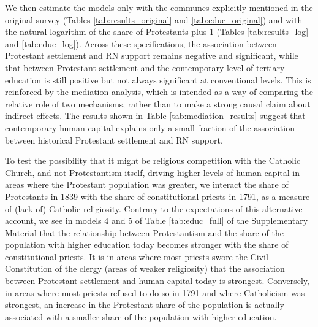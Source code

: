 \documentclass[12pt]{article}
\begin{document}
We then estimate the models only with the communes explicitly mentioned in the original survey (Tables \ref{tab:results_original} and \ref{tab:educ_original}) and with the natural logarithm of the share of Protestants plus 1 (Tables \ref{tab:results_log} and \ref{tab:educ_log}). Across these specifications, the association between Protestant settlement and RN support remains negative and significant, while that between Protestant settlement and the contemporary level of tertiary education is still positive but not always significant at conventional levels. This is reinforced by the mediation analysis, which is intended as a way of comparing the relative role of two mechanisms, rather than to make a strong causal claim about indirect effects. The results shown in Table \ref{tab:mediation_results} suggest that contemporary human capital explains only a small fraction of the association between historical Protestant settlement and RN support.

To test the possibility that it might be religious competition with the Catholic Church, and not Protestantism itself, driving higher levels of human capital in areas where the Protestant population was greater, we interact the share of Protestants in 1839 with the share of constitutional priests in 1791, as a measure of (lack of) Catholic religiosity. Contrary to the expectations of this alternative account, we see in models 4 and 5 of Table \ref{tab:educ_full} of the Supplementary Material that the relationship between Protestantism and the share of the population with higher education today becomes stronger with the share of constitutional priests. It is in areas where most priests swore the Civil Constitution of the clergy (areas of weaker religiosity) that the association between Protestant settlement and human capital today is strongest. Conversely, in areas where most priests refused to do so in 1791 and where Catholicism was strongest, an increase in the Protestant share of the population is actually associated with a smaller share of the population with higher education.
\end{document}
